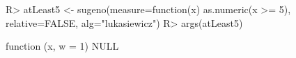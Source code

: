 \begin{Schunk}
% --begin: "quant1"
\begin{Sinput}
R> atLeast5 <- sugeno(measure=function(x) as.numeric(x >= 5),
                      relative=FALSE,
                      alg="lukasiewicz")
R> args(atLeast5)
\end{Sinput}
\begin{Soutput}
function (x, w = 1) 
NULL
\end{Soutput}
%
% --end: "quant1"
\end{Schunk}
